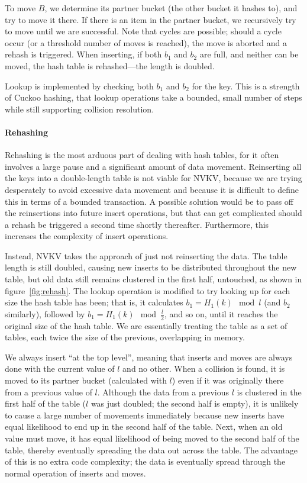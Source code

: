 To move $B$, we determine its partner bucket (the other bucket it hashes to),
and try to move it there. If there is an item in the partner bucket, we
recursively try to move until we are successful. Note that cycles are possible;
should a cycle occur (or a threshold number of moves is reached), the move is
aborted and a rehash is triggered. When inserting, if both $b_1$ and $b_2$ are
full, and neither can be moved, the hash table is rehashed---the length is
doubled.

Lookup is implemented by checking both $b_1$ and $b_2$ for the key. This is a
strength of Cuckoo hashing, that lookup operations take a bounded, small number
of steps while still supporting collision resolution.

\paragraph{Rehashing}

Rehashing is the most arduous part of dealing with hash tables, for it often
involves a large pause and a significant amount of data movement. Reinserting
all the keys into a double-length table is not viable for NVKV, because we are
trying desperately to avoid excessive data movement and because it is difficult
to define this in terms of a bounded transaction. A possible solution would be
to pass off the reinsertions into future insert operations, but that can get
complicated should a rehash be triggered a second time shortly thereafter.
Furthermore, this increases the complexity of insert operations.

Instead, NVKV takes the approach of just not reinserting the data. The table
length is still doubled, causing new inserts to be distributed throughout the
new table, but old data still remains clustered in the first half, untouched, as
shown in figure~\ref{fig:rehash}.
The lookup operation is modified to try looking up for each size the hash table
has been; that is, it calculates $b_1 = H_1(k) \mod l$ (and $b_2$ similarly),
followed by $b_1 = H_1(k) \mod \frac{l}{2}$, and so on, until it reaches the
original size of the hash table. We are essentially treating the table as a set
of tables, each twice the size of the previous, overlapping in memory.

We always insert ``at the top level'', meaning that inserts and moves are always
done with the current value of $l$ and no other. When a collision is found, it
is moved to its partner bucket (calculated with $l$) even if it was originally
there from a previous value of $l$. Although the data from a previous $l$ is
clustered in the first half of the table ($l$ was just doubled; the second half
is empty), it is unlikely to cause a large number of movements immediately
because new inserts have equal likelihood to end up in the second half of the
table. Next, when an old value must move, it has equal likelihood of being moved
to the second half of the table, thereby eventually spreading the data out
across the table. The advantage of this is no extra code complexity; the data is
eventually spread through the normal operation of inserts and moves.


